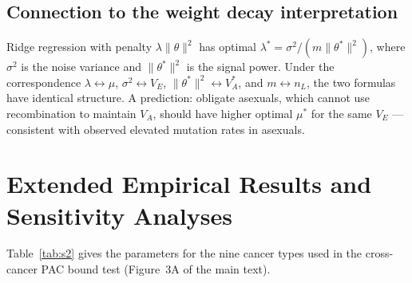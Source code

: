 \documentclass[12pt]{article}
\theoremstyle{remark}
\begin{document}
\subsection{Connection to the weight decay interpretation}

Ridge regression with penalty $\lambda \|\theta\|^2$ has optimal $\lambda^* = \sigma^2/(m \|\theta^*\|^2)$, where $\sigma^2$ is the noise variance and $\|\theta^*\|^2$ is the signal power. Under the correspondence $\lambda \leftrightarrow \mu$, $\sigma^2 \leftrightarrow V_E$, $\|\theta^*\|^2 \leftrightarrow V_A^*$, and $m \leftrightarrow n_L$, the two formulas have identical structure. A prediction: obligate asexuals, which cannot use recombination to maintain $V_A$, should have higher optimal $\mu^*$ for the same $V_E$ --- consistent with observed elevated mutation rates in asexuals.

\section{Extended Empirical Results and Sensitivity Analyses}

Table~\ref{tab:s2} gives the parameters for the nine cancer types used in the cross-cancer PAC bound test (Figure~3A of the main text).
\end{document}
